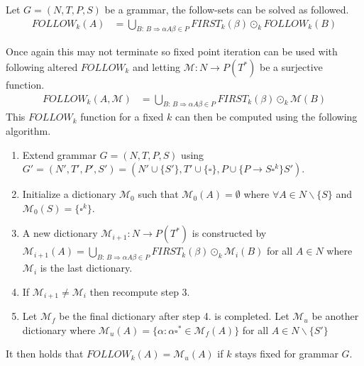 \begin{algorithm}
    Let $G = (N, T, P, S)$ be a grammar, the follow-sets can be solved as followed.
    \begin{align*}
        FOLLOW_k(A) &= \bigcup_{B : \, B \Rightarrow \alpha A \beta \in P} FIRST_k(\beta) \odot_k FOLLOW_k(B)
    \end{align*}
\end{algorithm}
\noindent Once again this may not terminate so fixed point iteration can be used with following altered $FOLLOW_k$ and letting $\mathcal{M}: N \to P(T^*)$ be a surjective function.
\begin{align*}
    FOLLOW_k(A, \mathcal{M}) &= \bigcup_{B : \, B \Rightarrow \alpha A \beta \in P} FIRST_k(\beta) \odot_k \mathcal{M}(B)
\end{align*}
This $FOLLOW_k$ function for a fixed $k$ can then be computed using the following algorithm.
\begin{enumerate}
    \item Extend grammar $G = (N, T, P, S)$ using $G' = (N', T', P', S') = (N' \cup \{S'\}, T' \cup \{\square\}, P \cup \{P \to S \square^k\} S')$.
    \item Initialize a dictionary $\mathcal{M}_0$ such that $\mathcal{M}_0(A) = \emptyset$ where $\forall A \in N \backslash \{S\}$ and $\mathcal{M}_0(S) = \{\square^k\}$.
    \item A new dictionary $\mathcal{M}_{i+1}: N \to P(T^*)$ is constructed by $\mathcal{M}_{i+1}(A) = \bigcup_{B : \, B \Rightarrow \alpha A \beta \in P} FIRST_k(\beta) \odot_k \mathcal{M}_{i}(B)$ for all $A \in N$ where $\mathcal{M}_i$ is the last dictionary.
    \item If $\mathcal{M}_{i+1} \neq \mathcal{M}_{i}$ then recompute step 3.
    \item Let $\mathcal{M}_f$ be the final dictionary after step 4. is completed. Let $\mathcal{M}_u$ be another dictionary where $\mathcal{M}_u(A) = \{\alpha : \alpha \square^* \in \mathcal{M}_f(A)\}$ for all $A \in N \backslash \{S'\}$ 
\end{enumerate}
It then holds that $FOLLOW_k(A) = \mathcal{M}_u(A)$ if $k$ stays fixed for grammar $G$.